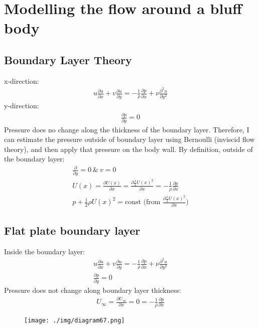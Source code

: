 \chapter{Modelling the flow around a bluff body}
\section{Boundary Layer Theory}
x-direction:
\begin{align}
  u \frac{\partial u}{\partial x} + v \frac{\partial u}{\partial y} = - \frac{1}{\rho} \frac{\partial p}{\partial x} + \nu \frac{\partial^2 u}{\partial y^2}
\end{align}
y-direction:
\begin{align}
  \frac{\partial p}{\partial y} = 0
\end{align}
Pressure does no change along the thickness of the boundary layer. Therefore, I can estimate the pressure outside of boundary layer using Bernoulli (inviscid flow theory), and then apply that pressure on the body wall. By definition, outside of the boundary layer:
\begin{gather}
  \frac{\partial}{\partial y} = 0 \ \& \ v = 0\\
  U(x) = \frac{\partial U(x)}{\partial x} = \frac{\partial \frac{1}{2} U(x)^2}{\partial x} = - \frac{1}{\rho} \frac{\partial p}{\partial x}\\
  p + \frac{1}{2} \rho U(x)^2 = \textrm{const (from } \frac{\partial \frac{1}{2} U(x)^2}{\partial x}\textrm{)}
\end{gather}
\section{Flat plate boundary layer}
Inside the boundary layer:
\begin{align}
  u \frac{\partial u}{\partial x} + v\frac{\partial u}{\partial y} = -\frac{1}{\rho} \frac{\partial p}{\partial x} + \nu \frac{\partial^2 u}{\partial y^2} \\
  \frac{\partial p}{\partial y} = 0
\end{align}
Pressure does not change along boundary layer thickness:
\begin{align}
  U_\infty = \frac{\partial U_\infty}{\partial x} = 0 = -\frac{1}{\rho} \frac{\partial p}{\partial x}
\end{align}
\begin{figure}[H]
  \centering
  \texttt{[image: ./img/diagram67.png]}
\end{figure}
